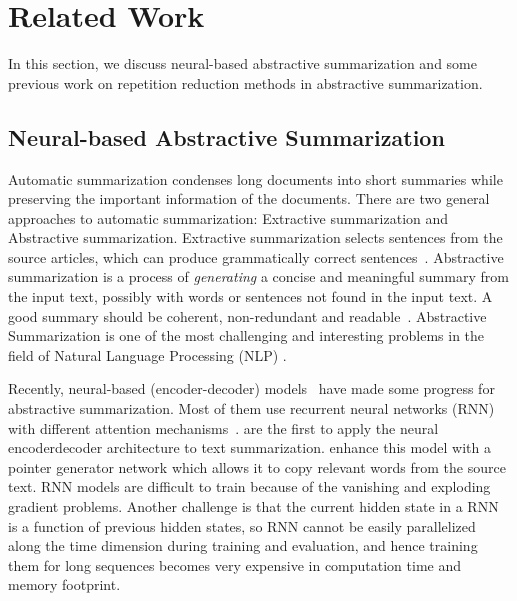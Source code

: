 \section{Related Work}
\label{sec:related}
In this section, we 
discuss neural-based abstractive summarization
and some previous work on repetition reduction methods in
abstractive summarization.

\subsection{Neural-based Abstractive Summarization}
Automatic summarization
condenses long documents into short summaries
while preserving the important information of the documents.
\citep{RadevHM02,AllahyariPASTGK17,Tian18}
There are two general approaches to automatic summarization: 
Extractive summarization and Abstractive summarization.
Extractive summarization selects sentences 
from the source articles, which can produce
grammatically correct sentences~\citep{BokaeiSL16,VermaL17,NaserasadiKS19,ZhongLWQH19}.
Abstractive summarization is a process of {\em generating} a concise and 
meaningful summary from the input text, possibly with words or sentences 
not found in the input text. 
A good summary should be coherent, 
non-redundant and readable~\citep{YaoWX17}.
Abstractive Summarization is one of the most challenging and 
interesting problems in the field of Natural Language Processing (NLP)
\citep{CareniniC08,PallottaDB09,SankarasubramaniamRG14,BingLLLGP15,RushCW15,LiHZ16,YaoWX17,MohamedO19,LierdeC19,NguyenCNN19}.

Recently, neural-based (encoder-decoder) models~\citep{RushCW15,ChopraAR16,NallapatiZSGX16,SeeLM17,PaulusXS17,HardyV18,KourisAS19,LiuL19,ZhangWZ19,WangQW19}
have made some progress for abstractive summarization.
Most of them use recurrent neural networks (RNN) with different attention 
mechanisms~\citep{RushCW15,NallapatiZSGX16,SeeLM17,PaulusXS17,HardyV18,
KourisAS19,ZhangWZ19}. \citet{RushCW15} are the first to apply the 
neural encoderdecoder architecture to text summarization. 
\citet{SeeLM17} enhance this model with a pointer generator network 
which allows it to copy relevant words from the source text.
RNN models are difficult to train because of the 
vanishing and exploding gradient problems.
Another challenge is that the current hidden state in a RNN is 
a function of previous hidden states, so RNN cannot be easily
parallelized along the time dimension during training and evaluation, 
and hence training them for long sequences becomes very expensive in 
computation time and memory footprint.

